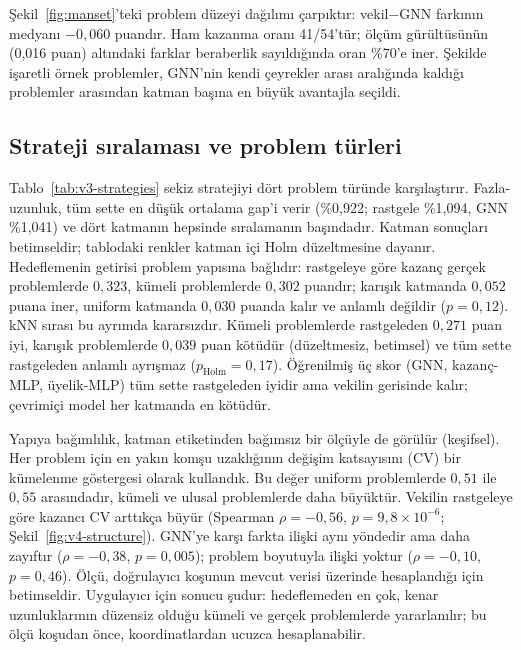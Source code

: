 

Şekil~\ref{fig:manset}'teki problem düzeyi dağılımı çarpıktır: vekil$-$GNN farkının medyanı
$-0{,}060$ puandır. Ham kazanma oranı 41/54'tür; ölçüm gürültüsünün (0,016 puan) altındaki farklar
beraberlik sayıldığında oran \%70'e iner. Şekilde işaretli örnek problemler, GNN'nin kendi
çeyrekler arası aralığında kaldığı problemler arasından katman başına en büyük avantajla seçildi.

\subsection{Strateji sıralaması ve problem türleri}\label{sec:bulgular-katman}

Tablo~\ref{tab:v3-strategies} sekiz stratejiyi dört problem türünde karşılaştırır. Fazla-uzunluk,
tüm sette en düşük ortalama gap'i verir (\%0,922; rastgele \%1,094, GNN \%1,041) ve dört katmanın
hepsinde sıralamanın başındadır.
Katman sonuçları betimseldir; tablodaki renkler katman içi Holm düzeltmesine dayanır. Hedeflemenin getirisi problem
yapısına bağlıdır: rastgeleye göre kazanç gerçek problemlerde $0{,}323$, kümeli problemlerde
$0{,}302$ puandır; karışık katmanda $0{,}052$ puana iner, uniform katmanda $0{,}030$ puanda kalır ve
anlamlı değildir ($p=0{,}12$).
kNN sırası bu ayrımda kararsızdır. Kümeli problemlerde rastgeleden $0{,}271$ puan iyi, karışık
problemlerde $0{,}039$ puan kötüdür (düzeltmesiz, betimsel) ve tüm sette rastgeleden anlamlı ayrışmaz
($p_{\mathrm{Holm}}=0{,}17$).
Öğrenilmiş üç skor (GNN, kazanç-MLP, üyelik-MLP) tüm sette rastgeleden iyidir ama vekilin gerisinde
kalır; çevrimiçi model her katmanda en kötüdür.

Yapıya bağımlılık, katman etiketinden bağımsız bir ölçüyle de görülür (keşifsel). Her problem için
en yakın komşu uzaklığının değişim katsayısını (CV) bir kümelenme göstergesi olarak kullandık. Bu
değer uniform problemlerde $0{,}51$ ile $0{,}55$ arasındadır, kümeli ve ulusal problemlerde daha
büyüktür.
Vekilin rastgeleye göre kazancı CV arttıkça büyür (Spearman $\rho=-0{,}56$, $p=9{,}8\times10^{-6}$;
Şekil~\ref{fig:v4-structure}). GNN'ye karşı farkta ilişki aynı yöndedir ama daha zayıftır
($\rho=-0{,}38$, $p=0{,}005$); problem boyutuyla ilişki yoktur ($\rho=-0{,}10$, $p=0{,}46$).
Ölçü, doğrulayıcı koşunun mevcut verisi üzerinde hesaplandığı için betimseldir. Uygulayıcı için
sonucu şudur: hedeflemeden en çok, kenar uzunluklarının düzensiz olduğu kümeli ve gerçek problemlerde
yararlanılır; bu ölçü koşudan önce, koordinatlardan ucuzca hesaplanabilir.

